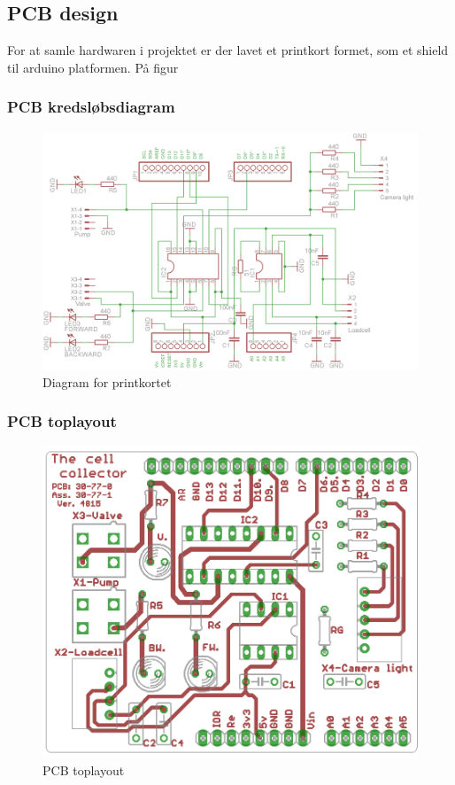  
 
 
 
\subsection{PCB design} 
For at samle hardwaren i projektet er der lavet et printkort formet, som et shield til arduino platformen. På figur 

\subsubsection{PCB kredsløbsdiagram}

\begin{figure}[H]
	\centering
	\includegraphics[width=1\textwidth]{billeder/hardware/Diagram.png}
	\caption{Diagram for printkortet}
	\label{fig:PCBdiagram}
\end{figure}

\subsubsection{PCB toplayout}

\begin{figure}[H]
	\centering
	\includegraphics[width=1\textwidth]{billeder/hardware/Toplayout.png}
	\caption{PCB toplayout}
	\label{fig:PCBtoplayout}
\end{figure}

